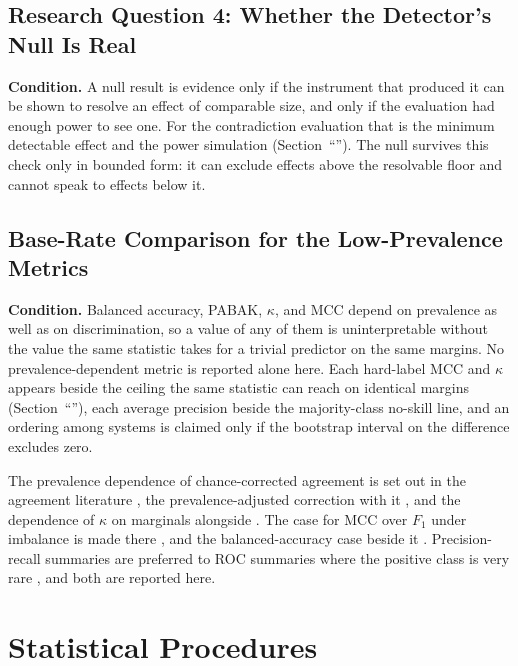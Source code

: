 \subsection{Research Question 4: Whether the Detector's Null Is Real}

\textbf{Condition.} A null result is evidence only if the instrument that produced it can be shown
to resolve an effect of comparable size, and only if the evaluation had enough power to see one.
For the contradiction evaluation that is the minimum detectable effect and the power simulation
(Section~``''). The null survives this check only in bounded form: it can exclude
effects above the resolvable floor and cannot speak to effects below it.

\subsection{Base-Rate Comparison for the Low-Prevalence Metrics}

\textbf{Condition.} Balanced accuracy, PABAK, $\kappa$, and MCC depend on prevalence as well as on
discrimination, so a value of any of them is uninterpretable without the value the same statistic
takes for a trivial predictor on the same margins. No prevalence-dependent metric is reported alone
here. Each hard-label MCC and $\kappa$ appears beside the ceiling the same statistic can reach on
identical margins (Section~``''), each average precision beside the
majority-class no-skill line, and an ordering among systems is claimed only if the bootstrap interval
on the difference excludes zero.

The prevalence dependence of chance-corrected
agreement is set out in the agreement literature \citep{feinstein1990paradoxes,cicchetti1990resolving}, the
prevalence-adjusted correction with it \citep{byrt1993pabak}, and the dependence of $\kappa$ on marginals
alongside \citep{delgado2019kappa}. The case for MCC over $F_1$ under imbalance is made there
\citep{chicco2020mcc}, and the balanced-accuracy case beside it \citep{brodersen2010balanced}.
Precision-recall summaries are preferred to ROC summaries where the positive class is very rare
\citep{saito2015prcurve}, and both are reported here.

\section{Statistical Procedures}
\label{sec:m-stats}

